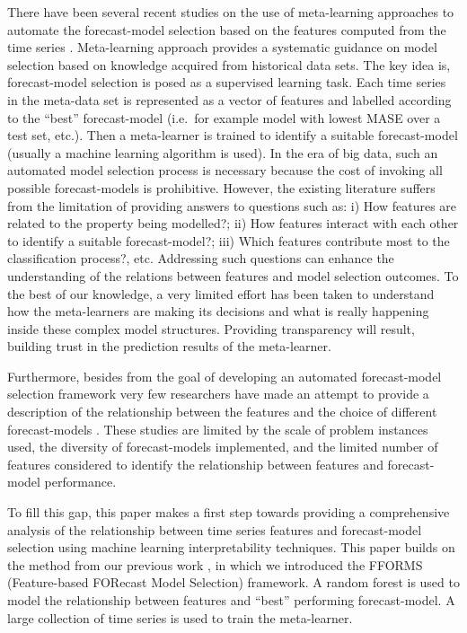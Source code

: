 \documentclass[11pt,a4paper,]{article}
\begin{document}
There have been several recent studies on the use of meta-learning
approaches to automate the forecast-model selection based on the
features computed from the time series
\autocites{shah1997model}{prudencio2004meta}{lemke2010meta}{kuck2016meta}.
Meta-learning approach provides a systematic guidance on model selection
based on knowledge acquired from historical data sets. The key idea is,
forecast-model selection is posed as a supervised learning task. Each
time series in the meta-data set is represented as a vector of features
and labelled according to the ``best'' forecast-model (i.e.~for example
model with lowest MASE over a test set, etc.). Then a meta-learner is
trained to identify a suitable forecast-model (usually a machine
learning algorithm is used). In the era of big data, such an automated
model selection process is necessary because the cost of invoking all
possible forecast-models is prohibitive. However, the existing
literature suffers from the limitation of providing answers to questions
such as: i) How features are related to the property being modelled?;
ii) How features interact with each other to identify a suitable
forecast-model?; iii) Which features contribute most to the
classification process?, etc. Addressing such questions can enhance the
understanding of the relations between features and model selection
outcomes. To the best of our knowledge, a very limited effort has been
taken to understand how the meta-learners are making its decisions and
what is really happening inside these complex model structures.
Providing transparency will result, building trust in the prediction
results of the meta-learner.

Furthermore, besides from the goal of developing an automated
forecast-model selection framework very few researchers have made an
attempt to provide a description of the relationship between the
features and the choice of different forecast-models
\autocites{schnaars1984situational}{wang2009rule}{lemke2010meta}{petropoulos2014horses}.
These studies are limited by the scale of problem instances used, the
diversity of forecast-models implemented, and the limited number of
features considered to identify the relationship between features and
forecast-model performance.

To fill this gap, this paper makes a first step towards providing a
comprehensive analysis of the relationship between time series features
and forecast-model selection using machine learning interpretability
techniques. This paper builds on the method from our previous work
\textcite{fforms}, in which we introduced the FFORMS (Feature-based
FORecast Model Selection) framework. A random forest is used to model
the relationship between features and ``best'' performing
forecast-model. A large collection of time series is used to train the
meta-learner.
\end{document}
